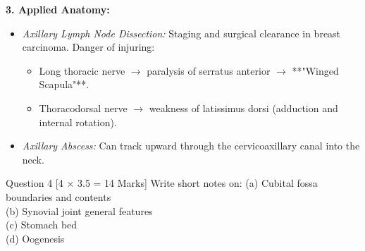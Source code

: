 \documentclass[11pt,a4paper]{article}
\begin{document}
\begin{ansbox}
\textbf{3. Applied Anatomy:}
\begin{itemize}[leftmargin=*]
    \item \textit{Axillary Lymph Node Dissection:} Staging and surgical clearance in breast carcinoma. Danger of injuring:
    \begin{itemize}
        \item Long thoracic nerve $\rightarrow$ paralysis of serratus anterior $\rightarrow$ **"Winged Scapula"**.
        \item Thoracodorsal nerve $\rightarrow$ weakness of latissimus dorsi (adduction and internal rotation).
    \end{itemize}
    \item \textit{Axillary Abscess:} Can track upward through the cervicoaxillary canal into the neck.
\end{itemize}
\end{ansbox}

\begin{qbox}{Question 4 [4 $\times$ 3.5 = 14 Marks]}
Write short notes on:
(a) Cubital fossa boundaries and contents \\
(b) Synovial joint general features \\
(c) Stomach bed \\
(d) Oogenesis
\end{qbox}
\end{document}
